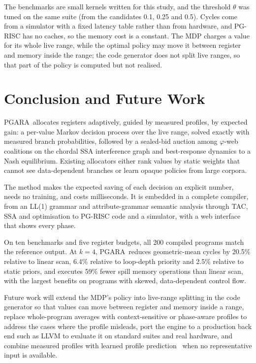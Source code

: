 \documentclass[conference]{IEEEtran}
\newcommand{\MG}{PGARA}
\begin{document}
The benchmarks are small kernels written for this study, and the
threshold $\theta$ was tuned on the same suite (from the candidates
0.1, 0.25 and 0.5). Cycles come from a simulator with a fixed latency
table rather than from hardware, and PG-RISC has no caches, so the
memory cost is a constant. The MDP charges a value for its whole live
range, while the optimal policy may move it between register and memory
inside the range; the code generator does not split live ranges, so
that part of the policy is computed but not realised.

\section{Conclusion and Future Work}
\label{sec:conclusion}

\MG\ allocates registers adaptively, guided by measured profiles, by
expected gain: a per-value Markov decision
process over the live range, solved exactly with measured branch
probabilities, followed by a sealed-bid auction among $\varphi$-web
coalitions on the chordal SSA interference graph and best-response
dynamics to a Nash equilibrium. Existing allocators either rank values
by static weights that cannot see data-dependent branches or learn
opaque policies from large corpora.

The method makes the expected saving of each decision an explicit
number, needs no training, and costs milliseconds. It is embedded in a
complete compiler, from an LL(1) grammar and attribute-grammar semantic
analysis through TAC, SSA and optimisation to PG-RISC code and a
simulator, with a web interface that shows every phase.

On ten benchmarks and five register budgets, all 200 compiled programs
match the reference output. At $k=4$, \MG\ reduces geometric-mean
cycles by 20.5\% relative to linear scan, 6.4\% relative to loop-depth
priority and 2.5\% relative to static priors, and executes 59\% fewer
spill memory operations than linear scan, with the largest benefits on
programs with skewed, data-dependent control flow.

Future work will extend the MDP's policy into live-range splitting in
the code generator so that values can move between register and memory
inside a range, replace whole-program averages with context-sensitive
or phase-aware profiles to address the cases where the profile
misleads, port the engine to a production back end such as LLVM to
evaluate it on standard suites and real hardware, and combine measured
profiles with learned profile prediction~\cite{rotem2021pgo} when no
representative input is available.
\end{document}
